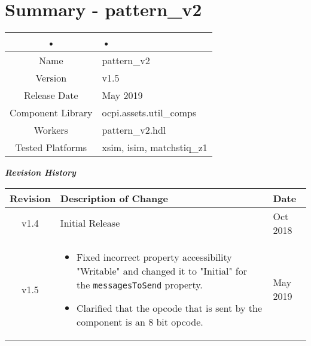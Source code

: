 \documentclass{article}
\author{} %
\date{Version \docVersion} %
\title{\docTitle}
\def\comp{pattern\_v2}
\begin{document}
\section*{Summary - \comp}
	\begin{tabular}{|c|M{13.5cm}|}
		\hline
		• & • \\
		\hline
		Name & \comp \\
		\hline
		Version & v1.5 \\
		\hline
		Release Date & May 2019 \\
		\hline
		Component Library & ocpi.assets.util\_comps \\
		\hline
		Workers & \comp.hdl \\
		\hline
		Tested Platforms & xsim, isim, matchstiq\_z1 \\
		\hline
	\end{tabular}
	
	\begin{center}
	\textit{\textbf{Revision History}}
		\begin{table}[H]
		\label{table:revisions} %
			\begin{tabularx}{\textwidth}{|c|X|l|}
			\hline
			\rowcolor{blue}
			\textbf{Revision} & \textbf{Description of Change} & \textbf{Date} \\
		    \hline
		    v1.4 & Initial Release & Oct 2018 \\
		    \hline
        v1.5 & \begin{itemize} \item Fixed incorrect property accessibility "Writable" and changed it to "Initial" for the \texttt{messagesToSend} property. \item Clarified that the opcode that is sent by the component is an 8 bit opcode. \end{itemize} & May 2019 \\
		    \hline
			\end{tabularx}
		\end{table}
	\end{center}
	
\end{document}
